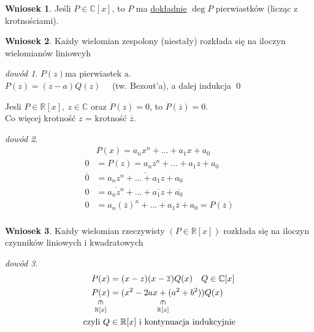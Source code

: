 \documentclass[10pt]{article}
\newcommand{\vertin}{\rotatebox{90}{$\ni$}}
\newcommand{\underscript}[3]{\underset{\scriptstyle{\overset{#2}{#3}}}{#1}}
\theoremstyle{definition}
\theoremstyle{definition}
\theoremstyle{definition}
\theoremstyle{definition}
\theoremstyle{remark}
\newtheorem*{dd}{dowód}
\theoremstyle{definition}
\theoremstyle{definition}
\newtheorem*{wn}{Wniosek}
\theoremstyle{definition}
\theoremstyle{definition}
\theoremstyle{definition}
\begin{document}
\begin{wn} 
    Jeśli $P \in \mathbb{C}[x]$, to $P$ ma \underline{dokładnie} $\operatorname{deg} P$ pierwiastków 
    (licząc z krotnościami).
\end{wn}
\begin{wn} 
    Każdy wielomian zespolony (niestały) rozkłada się na iloczyn wielomianów liniowcyh \end{wn} 
\begin{dd} 
    $P(z) $ma pierwiastek a.\\ 
    $P(z) = (z-a)Q(z) \quad$ (tw. Bezout'a), a dalej indukcja \hfill \qed
\end{dd} 
\begin{ft} 
    Jesli $P \in \mathbb{R}[x], \ z \in \mathbb{C} $ oraz $P(z) = 0$, to $P(\overline{z}) = 0$. \\ 
    Co więcej krotność $z$ = krotność $\overline{z}$.
\end{ft}
\begin{dd} 
    \begin{align*} 
        &P(x) = a_nx^n + \ldots + a_1x + a_0 \\ 
        0 &= P(z) = a_nz^n + \ldots + a_1z + a_0 \\ 
        \overline{0} &= \overline{a_nz^n + \ldots + a_1z+a_0}\\ 
        0 &= \overline{a_nz^n} + \ldots + \overline{a_1z} + \overline{a_0} \\ 
        0 &= a_n(\overline{z})^n + \ldots + a_1\overline{z} + a_0 = P(\overline{z}) \\
    \end{align*} 
\end{dd} 
\begin{wn} 
    Każdy wielomian rzeczywisty $(P \in \mathbb{R}[x])$ rozkłada się na iloczyn czynników liniowych i kwadratowych
\end{wn}
\begin{dd} 
    \begin{align*} 
        P(x) & = (x-z)(x-\overline{z})Q(x) \quad Q \in \mathbb{C}[x] \\  
        \underscript{P(x)}{\vertin}{\mathbb{R}[x]} & = \underscript{(x^2 - 2ax + (a^2 + b^2))}{\vertin}{\mathbb{R}[x]}Q(x) \\ 
        \text{czyli } Q &\in \mathbb{R}[x] \text{ i kontynuacja indukcyjnie}
    \end{align*}
\end{dd} 
\end{document}
